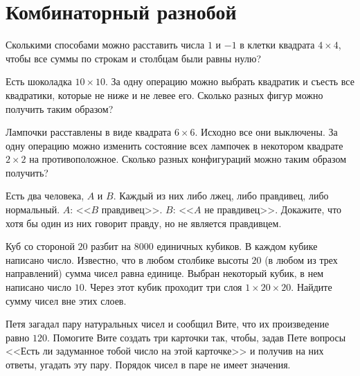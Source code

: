 

\section*{Комбинаторный разнобой}


\begin{problems}


\item
Сколькими способами можно расставить числа $1$ и $-1$ в клетки квадрата
$4 \times 4$, чтобы все суммы по строкам и столбцам были равны нулю?

\item
Есть шоколадка $10 \times 10$.
За одну операцию можно выбрать квадратик и съесть все квадратики, которые не
ниже и не левее его.
Сколько разных фигур можно получить таким образом?

\item
Лампочки расставлены в виде квадрата $6 \times 6$.
Исходно все они выключены.
За одну операцию можно изменить состояние всех лампочек в некотором квадрате
$2 \times 2$ на противоположное.
Сколько разных конфигураций можно таким образом получить?

\item
Есть два человека, $A$ и $B$.
Каждый из них либо лжец, либо правдивец, либо нормальный.
$A$: <<$B$ правдивец>>.
$B$: <<$A$ не правдивец>>.
Докажите, что хотя бы один из них говорит правду, но не является правдивцем.

\item
Куб со стороной $20$ разбит на $8000$ единичных кубиков.
В каждом кубике написано число.
Известно, что в любом столбике высоты $20$ (в любом из трех направлений) сумма
чисел равна единице.
Выбран некоторый кубик, в нем написано число $10$.
Через этот кубик проходит три слоя $1\times 20 \times 20$.
Найдите сумму чисел вне этих слоев.

\item
Петя загадал пару натуральных чисел и сообщил Вите, что их произведение равно
$120$.
Помогите Вите создать три карточки так, чтобы, задав Пете вопросы
<<Есть ли задуманное тобой число на этой карточке>> и получив на них ответы,
угадать эту пару.
Порядок чисел в паре не имеет значения.

\end{problems}

